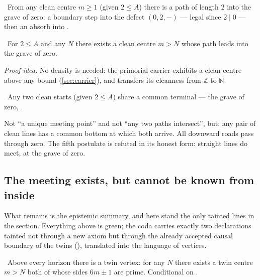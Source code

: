 \begin{theorem}\label{thm:line_to_origin}
\green{}\ From any clean centre $m \ge 1$ (given $2 \le A$) there is a path of length $2$ into the
grave of zero: a boundary step into the defect $(0,2,-)$ --- legal since $2 \mid 0$ --- then an absorb
into . 
\end{theorem}

\begin{theorem}\label{thm:web_above_every_horizon}
\green{}\ For $2 \le A$ and any $N$ there exists a clean centre $m > N$ whose path leads into the grave
of zero. 
\end{theorem}

\emph{Proof idea.} No density is needed: the primorial carrier 
exhibits a clean centre above any bound (\cref{sec:carrier}), and  transfers
its cleanness from $\mathbb{Z}$ to $\mathbb{N}$.

\begin{theorem}\label{thm:lines_meet_at_origin}
\green{}\ Any two clean starts (given $2 \le A$) share a common terminal --- the grave of zero,
. 
\end{theorem}

Not ``a unique meeting point'' and not ``any two paths intersect'', but: any pair of clean lines has a
common bottom at which both arrive. All downward roads pass through zero. The fifth postulate is
refuted in its honest form: straight lines do meet, at the grave of zero.

\subsection{The meeting exists, but cannot be known from inside}

What remains is the epistemic summary, and here stand the only tainted lines in the section.
Everything above is green; the coda carries exactly two declarations tainted not through a new axiom
but through the already accepted causal boundary of the twins
(), translated into the language of vertices.

\begin{theorem}\label{thm:twin_vertices_beyond_every_horizon}
\yellow{}\ Above every horizon there is a twin vertex: for any $N$ there exists a twin centre $m > N$
both of whose sides $6m \pm 1$ are prime. Conditional on \axiom{}.
\end{theorem}

